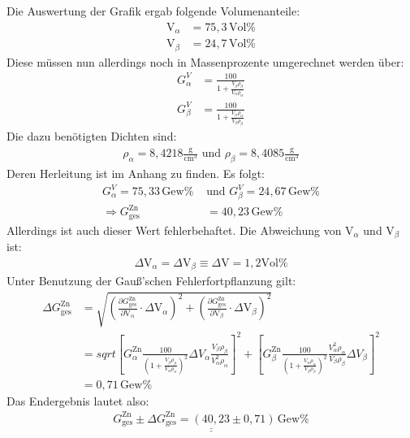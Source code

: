 \documentclass[german,  %
parskip=full,  %
]{scrartcl}
\begin{document}
Die Auswertung der Grafik ergab folgende Volumenanteile:
\begin{align*}
\text{V}_{\alpha} &= 75,3 \, \text{Vol}\% \\
\text{V}_{\beta} &= 24,7 \, \text{Vol}\%
\end{align*}
Diese müssen nun allerdings noch in Massenprozente umgerechnet werden über:
\begin{align*}
G_{\alpha}^{V} &= \frac{100}{1+\frac{V_{\beta}\rho_{\beta}}{V_{\alpha} \rho_{\alpha}}} \\
G_{\beta}^{V} &= \frac{100}{1+\frac{V_{\alpha}\rho_{\alpha}}{V_{\beta} \rho_{\beta}}}
\end{align*}
Die dazu benötigten Dichten sind:
\begin{align}
\rho_{\alpha} = 8,4218 \frac{\text{g}}{\text{cm}^3} \,\, \text{und} \,\, \rho_{\beta} = 8,4085 \frac{\text{g}}{\text{cm}^3}
\end{align}
Deren Herleitung ist im Anhang zu finden.
Es folgt:
\begin{align*}
G_{\alpha}^{V} = 75,33\, \text{Gew}\% \,\, &\text{und} \,\, G_{\beta}^{V} = 24,67\, \text{Gew}\% \\
\Rightarrow G_{\text{ges}}^{\text{Zn}} &= 40,23 \, \text{Gew}\%
\end{align*}
Allerdings ist auch dieser Wert fehlerbehaftet. Die Abweichung von $\text{V}_{\alpha}$ und $\text{V}_{\beta}$ ist:
\begin{align*}
\Delta \text{V}_{\alpha} = \Delta \text{V}_{\beta} \equiv \Delta \text{V} = 1,2\text{Vol}\%
\end{align*}
Unter Benutzung der Gauß'schen Fehlerfortpflanzung gilt:
\begin{align*}
\Delta G_{\text{ges}}^{\text{Zn}} &= \sqrt{\left(\frac{\partial G_{\text{ges}}^{\text{Zn}}}{\partial \text{V}_{\alpha}} \cdot
\Delta \text{V}_{\alpha}\right)^2 + \left(\frac{\partial G_{\text{ges}}^{\text{Zn}}}{\partial \text{V}_{\beta}} \cdot
\Delta \text{V}_{\beta}\right)^2} \\
&= sqrt{\left[G_{\alpha}^{\text{Zn}} \frac{100}{\left(1+\frac{V_{\beta} \rho_{\beta}}{V_{\alpha} \rho_{\alpha}}\right)^2} \Delta V_{\alpha} \frac{V_{\beta} \rho_{\beta}}{V_{\alpha}^2\rho_{\alpha}}\right]^2 + \left[G_{\beta}^{\text{Zn}} \frac{100}{\left(1+\frac{V_{\alpha} \rho_{\alpha}}{V_{\beta} \rho_{\beta}}\right)^2} \frac{V_{\alpha}^2\rho_{\alpha}}{V_{\beta} \rho_{\beta}} \Delta V_{\beta}\right]^2} \\
&= 0,71 \, \text{Gew}\%
\end{align*}
Das Endergebnis lautet also:
\begin{align*}
\underline{\underline{G_{\text{ges}}^{\text{Zn}} \pm \Delta G_{\text{ges}}^{\text{Zn}} = (40,23 \pm 0,71) \, \text{Gew}\%}}
\end{align*}
\end{document}
